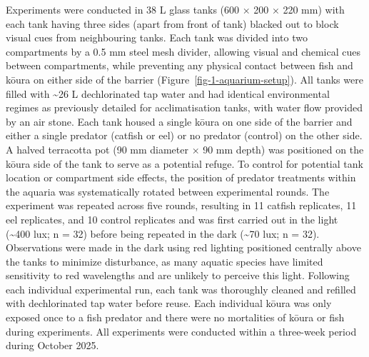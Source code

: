 \documentclass[
  letterpaper,
  DIV=11,
  numbers=noendperiod]{scrartcl}
\begin{document}
Experiments were conducted in 38 L glass tanks (600 × 200 × 220 mm) with
each tank having three sides (apart from front of tank) blacked out to
block visual cues from neighbouring tanks. Each tank was divided into
two compartments by a 0.5 mm steel mesh divider, allowing visual and
chemical cues between compartments, while preventing any physical
contact between fish and kōura on either side of the barrier
(Figure~\ref{fig-1-aquarium-setup}). All tanks were filled with
\textasciitilde26 L dechlorinated tap water and had identical
environmental regimes as previously detailed for acclimatisation tanks,
with water flow provided by an air stone. Each tank housed a single
kōura on one side of the barrier and either a single predator (catfish
or eel) or no predator (control) on the other side. A halved terracotta
pot (90 mm diameter × 90 mm depth) was positioned on the kōura side of
the tank to serve as a potential refuge. To control for potential tank
location or compartment side effects, the position of predator
treatments within the aquaria was systematically rotated between
experimental rounds. The experiment was repeated across five rounds,
resulting in 11 catfish replicates, 11 eel replicates, and 10 control
replicates and was first carried out in the light (\textasciitilde400
lux; n = 32) before being repeated in the dark (\textasciitilde70 lux; n
= 32). Observations were made in the dark using red lighting positioned
centrally above the tanks to minimize disturbance, as many aquatic
species have limited sensitivity to red wavelengths and are unlikely to
perceive this light. Following each individual experimental run, each
tank was thoroughly cleaned and refilled with dechlorinated tap water
before reuse. Each individual kōura was only exposed once to a fish
predator and there were no mortalities of kōura or fish during
experiments. All experiments were conducted within a three-week period
during October 2025.
\end{document}
